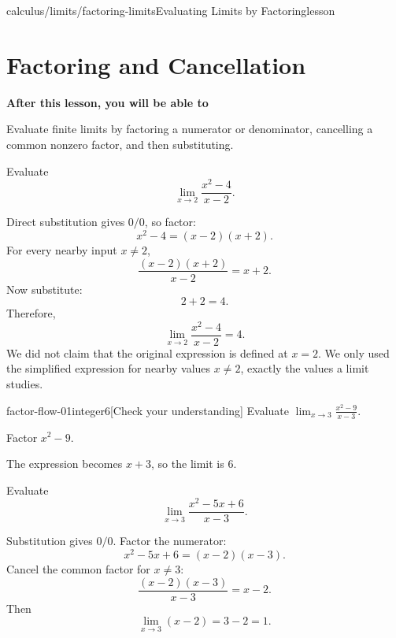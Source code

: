 \documentclass[11pt,openany]{book}
\theoremstyle{bgplain}
\newcounter{bgexample}[chapter]
\newcounter{bgcheck}[section]
\newcommand{\lessonobjective}[1]{%
  \par\Needspace{4\baselineskip}\addvspace{0.6em}%
  {\bfseries\color{BGInk}After this lesson, you will be able to}\par\smallskip
  #1\par\addvspace{0.5em}%
}
\begin{document}
\begin{webpage}{calculus/limits/factoring-limits}{Evaluating Limits by Factoring}{lesson}
\section{Factoring and Cancellation}

\lessonobjective{
Evaluate finite limits by factoring a numerator or denominator, cancelling a common nonzero factor, and then substituting.
}

\begin{bgguided}[title={Why cancellation is legal in a limit}]
Evaluate
\[
  \lim_{x\to2}\frac{x^2-4}{x-2}.
\]

\begin{bgsolution}
Direct substitution gives \(0/0\), so factor:
\[
  x^2-4=(x-2)(x+2).
\]
For every nearby input \(x\ne2\),
\[
  \frac{(x-2)(x+2)}{x-2}=x+2.
\]
Now substitute:
\[
  2+2=4.
\]
Therefore,
\[
  \boxed{\lim_{x\to2}\frac{x^2-4}{x-2}=4}.
\]
We did not claim that the original expression is defined at \(x=2\). We only used the simplified expression for nearby values \(x\ne2\), exactly the values a limit studies.
\end{bgsolution}
\end{bgguided}


\begin{bgcheck}{factor-flow-01}{integer}{6}[Check your understanding]
Evaluate \(\lim_{x\to3}\frac{x^2-9}{x-3}\).
\begin{bghint}
Factor \(x^2-9\).
\end{bghint}
\begin{bgreveal}
The expression becomes \(x+3\), so the limit is \(6\).
\end{bgreveal}
\end{bgcheck}



\begin{bgexample}[title={Factor a quadratic}]
Evaluate
\[
  \lim_{x\to3}\frac{x^2-5x+6}{x-3}.
\]

\begin{bgsolution}
Substitution gives \(0/0\). Factor the numerator:
\[
  x^2-5x+6=(x-2)(x-3).
\]
Cancel the common factor for \(x\ne3\):
\[
  \frac{(x-2)(x-3)}{x-3}=x-2.
\]
Then
\[
  \lim_{x\to3}(x-2)=3-2=\boxed{1}.
\]
\end{bgsolution}
\end{bgexample}


\end{webpage}
\end{document}
